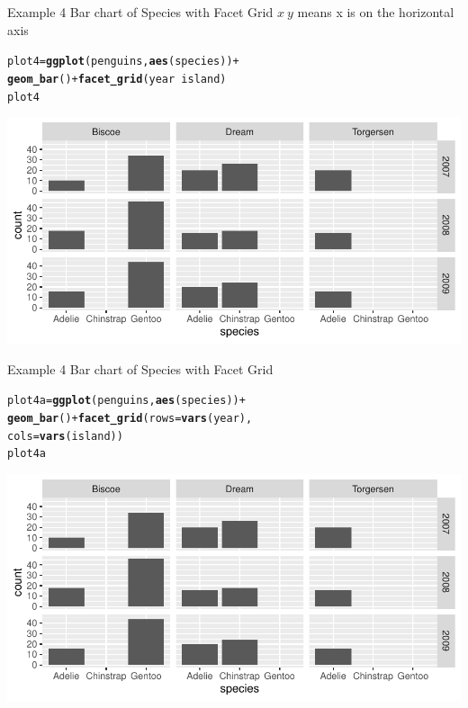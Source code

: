 \documentclass{beamer}\usepackage[]{graphicx}\usepackage[]{color}
\makeatletter
\newcommand{\hlopt}[1]{\textcolor[rgb]{0,0,0}{#1}}%
\newcommand{\hlstd}[1]{\textcolor[rgb]{0.345,0.345,0.345}{#1}}%
\newcommand{\hlkwb}[1]{\textcolor[rgb]{0.69,0.353,0.396}{#1}}%
\newcommand{\hlkwc}[1]{\textcolor[rgb]{0.333,0.667,0.333}{#1}}%
\newcommand{\hlkwd}[1]{\textcolor[rgb]{0.737,0.353,0.396}{\textbf{#1}}}%
\newenvironment{kframe}{%
 \def\at@end@of@kframe{}%
 \ifinner\ifhmode%
  \def\at@end@of@kframe{\end{minipage}}%
  \begin{minipage}{\columnwidth}%
 \fi\fi%
 \def\FrameCommand##1{\hskip\@totalleftmargin \hskip-\fboxsep
 \colorbox{shadecolor}{##1}\hskip-\fboxsep
     \hskip-\linewidth \hskip-\@totalleftmargin \hskip\columnwidth}%
 \MakeFramed {\advance\hsize-\width
   \@totalleftmargin\z@ \linewidth\hsize
   \@setminipage}}%
 {\par\unskip\endMakeFramed%
 \at@end@of@kframe}
\newenvironment{knitrout}{}{} %
\makeatother
\begin{document}
\begin{frame}[fragile]{Example 4 Bar chart of Species with Facet Grid}
$x~y$ means x is on the horizontal axis
\begin{knitrout}
\color{fgcolor}\begin{kframe}
\begin{alltt}
\hlstd{plot4} \hlkwb{=} \hlkwd{ggplot}\hlstd{(penguins,} \hlkwd{aes}\hlstd{(species))} \hlopt{+}
    \hlkwd{geom_bar}\hlstd{()} \hlopt{+} \hlkwd{facet_grid}\hlstd{(year} \hlopt{~} \hlstd{island)}
\hlstd{plot4}
\end{alltt}
\end{kframe}
\includegraphics[width=0.95\linewidth]{figure/unnamed-chunk-15-1} 
\end{knitrout}


\end{frame}

\begin{frame}[fragile]{Example 4 Bar chart of Species with Facet Grid }
\begin{knitrout}
\color{fgcolor}\begin{kframe}
\begin{alltt}
\hlstd{plot4a} \hlkwb{=} \hlkwd{ggplot}\hlstd{(penguins,} \hlkwd{aes}\hlstd{(species))} \hlopt{+}
    \hlkwd{geom_bar}\hlstd{()} \hlopt{+} \hlkwd{facet_grid}\hlstd{(}\hlkwc{rows} \hlstd{=} \hlkwd{vars}\hlstd{(year),}
    \hlkwc{cols} \hlstd{=} \hlkwd{vars}\hlstd{(island))}
\hlstd{plot4a}
\end{alltt}
\end{kframe}
\includegraphics[width=0.95\linewidth]{figure/unnamed-chunk-16-1} 
\end{knitrout}
\end{frame}
\end{document}
